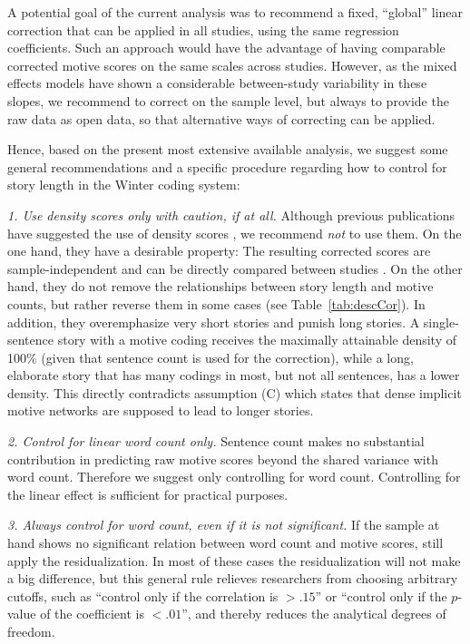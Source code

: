 \documentclass[jou,a4paper]{apa6}\usepackage[]{graphicx}\usepackage[]{color}
\begin{document}
A potential goal of the current analysis was to recommend a fixed, ``global'' linear correction that can be applied in all studies, using the same regression coefficients. Such an approach would have the advantage of having comparable corrected motive scores on the same scales across studies. However, as the mixed effects models have shown a considerable between-study variability in these slopes, we recommend to correct on the sample level, but always to provide the raw data as open data, so that alternative ways of correcting can be applied.

Hence, based on the present most extensive available analysis, we suggest some general recommendations and a specific procedure regarding how to control for story length in the Winter coding system:

\emph{1. Use density scores only with caution, if at all.} Although previous publications have suggested the use of density scores \parencite[e.g., ][]{winter_MeasuringPersonalityDistance_1991}, we recommend \emph{not} to use them. On the one hand, they have a desirable property: The resulting corrected scores are sample-independent and can be directly compared between studies \parencite{schultheiss_MeasuringImplicitMotives_2007}. On the other hand, they do not remove the relationships between story length and motive counts, but rather reverse them in some cases (see Table~\ref{tab:descCor}). In addition, they overemphasize very short stories and punish long stories. A single-sentence story with a motive coding receives the maximally attainable density of 100\% (given that sentence count is used for the correction), while a long, elaborate story that has many codings in most, but not all sentences, has a lower density. This directly contradicts assumption (C) which states that dense implicit motive networks are supposed to lead to longer stories.

\emph{2. Control for linear word count only.} Sentence count makes no substantial contribution in predicting raw motive scores beyond the shared variance with word count. Therefore we suggest only controlling for word count. Controlling for the linear effect is sufficient for practical purposes.

\emph{3. Always control for word count, even if it is not significant.} If the sample at hand shows no significant relation between word count and motive scores, still apply the residualization. In most of these cases the residualization will not make a big difference, but this general rule relieves researchers from choosing arbitrary cutoffs, such as ``control only if the correlation is $> .15$'' or ``control only if the $p$-value of the coefficient is $<.01$'', and thereby reduces the analytical degrees of freedom.
\end{document}
